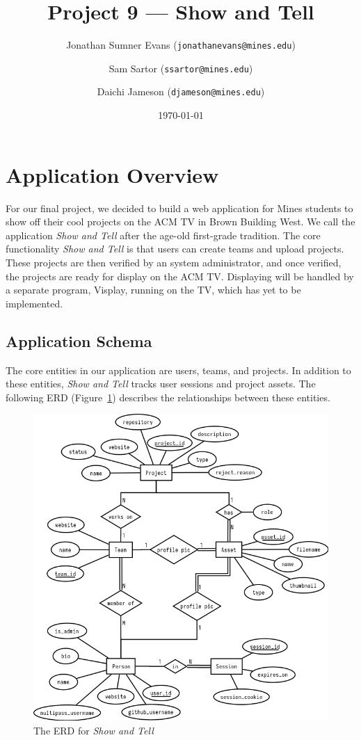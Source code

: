 \documentclass[12pt]{article}
\title{Project 9 --- Show and Tell}
\author{
    Jonathan Sumner Evans (\texttt{jonathanevans@mines.edu})
    \and
    Sam Sartor (\texttt{ssartor@mines.edu})
    \and
    Daichi Jameson (\texttt{djameson@mines.edu})
}
\date{\today}
\newcommand{\app}{\textit{Show and Tell}\xspace}
\begin{document}
\maketitle

\section{Application Overview}
For our final project, we decided to build a web application for Mines students
to show off their cool projects on the ACM TV in Brown Building West. We call
the application \app after the age-old first-grade tradition. The core
functionality \app is that users can create teams and upload projects. These
projects are then verified by an system administrator, and once verified, the
projects are ready for display on the ACM TV. Displaying will be handled by a
separate program, Visplay, running on the TV, which has yet to be implemented.

\subsection{Application Schema}
The core entities in our application are users, teams, and projects. In addition
to these entities, \app tracks user sessions and project assets. The following
ERD (Figure~\ref{fig:erd}) describes the relationships between these entities.

\begin{figure}[H]
    \includegraphics[width=\textwidth]{erd-new}
    \caption{The ERD for \app}
    \label{fig:erd}
\end{figure}
\end{document}
